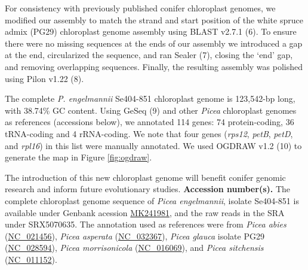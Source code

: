 \documentclass[titlepage,11pt, oneside]{article}   	%
\begin{document}
\newline
\par
For consistency with previously published conifer chloroplast genomes, we modified our assembly to match the strand and start position of the white spruce admix (PG29) chloroplast genome assembly using BLAST v2.7.1 (6). To ensure there were no missing sequences at the ends of our assembly we introduced a gap at the end, circularized the sequence, and ran Sealer (7), closing the ‘end’ gap, and removing overlapping sequences. Finally, the resulting assembly was polished using Pilon v1.22 (8).
\newline
\par
The complete \textit{P. engelmannii} Se404-851 chloroplast genome is 123,542-bp long, with 38.74\% GC content. Using GeSeq (9) and other \textit{Picea} chloroplast genomes as references (accessions below), we annotated 114 genes: 74 protein-coding, 36 tRNA-coding and 4 rRNA-coding. We note that four genes (\textit{rps12}, \textit{petB}, \textit{petD}, and \textit{rpl16}) in this list were manually annotated. We used OGDRAW v1.2 (10) to generate the map in Figure \ref{fig:ogdraw}.
\newline
\par
The introduction of this new chloroplast genome will benefit conifer genomic research and inform future evolutionary studies.
\newline
\newline
\textbf{Accession number(s).} The complete chloroplast genome sequence of \textit{Picea engelmannii}, isolate Se404-851 is available under Genbank acession \href{https://www.ncbi.nlm.nih.gov/nuccore/MK241981}{MK241981}, and the raw reads in the SRA under SRX5070635. The annotation used as references were from \textit{Picea abies} (\href{https://www.ncbi.nlm.nih.gov/nuccore/NC_021456}{NC\_021456}), \textit{Picea asperata} (\href{https://www.ncbi.nlm.nih.gov/nuccore/NC_032367}{NC\_032367}), \textit{Picea glauca} isolate PG29 (\href{https://www.ncbi.nlm.nih.gov/nuccore/NC_028594}{NC\_028594}), \textit{Picea morrisonicola} (\href{https://www.ncbi.nlm.nih.gov/nuccore/NC_016069}{NC\_016069}), and \textit{Picea sitchensis} (\href{https://www.ncbi.nlm.nih.gov/nuccore/NC_011152}{NC\_011152}).
\end{document}
